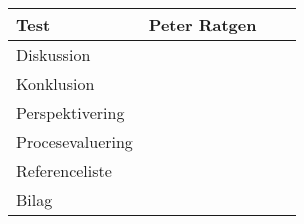 \begin{table}[h!]
\begin{tabular}{|p{45mm}|p{30mm}|p{30mm}|p{35mm}|}
        Test                   & Peter Ratgen     &          &  \\ \hline
        Diskussion             &                  &          &  \\ \hline
        Konklusion             &                  &          &  \\ \hline
        Perspektivering        &                  &          &  \\ \hline
        Procesevaluering       &                  &          &  \\ \hline
        Referenceliste         &                  &          &  \\ \hline
        Bilag                  &                  &          &  \\ \hline
    \end{tabular}
\end{table}

\clearpage
